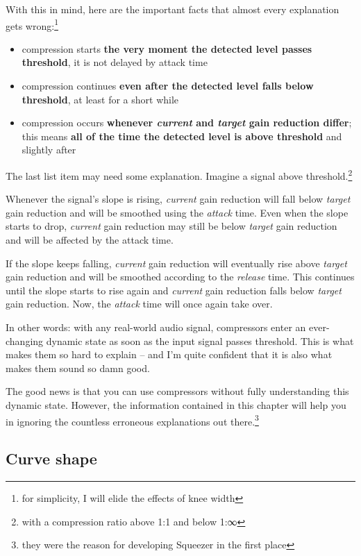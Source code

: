 With this in mind, here are the important facts that almost every
explanation gets wrong:\footnote{for simplicity, I will elide the
  effects of knee width}

\begin{itemize}
\item compression starts \textbf{the very moment the detected level
    passes threshold}, it is not delayed by attack time
\item compression continues \textbf{even after the detected level
    falls below threshold}, at least for a short while
\item compression occurs \textbf{whenever \emph{current} and
    \emph{target} gain reduction differ}; this means \textbf{all of
    the time the detected level is above threshold} and slightly after
\end{itemize}

The last list item may need some explanation.  Imagine a signal above
threshold.\footnote{with a compression ratio above 1:1 and below 1:∞}

Whenever the signal's slope is rising, \emph{current} gain reduction
will fall below \emph{target} gain reduction and will be smoothed
using the \emph{attack} time.  Even when the slope starts to drop,
\emph{current} gain reduction may still be below \emph{target} gain
reduction and will be affected by the attack time.

If the slope keeps falling, \emph{current} gain reduction will
eventually rise above \emph{target} gain reduction and will be
smoothed according to the \emph{release} time.  This continues until
the slope starts to rise again and \emph{current} gain reduction falls
below \emph{target} gain reduction.  Now, the \emph{attack} time will
once again take over.

In other words: with any real-world audio signal, compressors enter an
ever-changing dynamic state as soon as the input signal passes
threshold.  This is what makes them so hard to explain -- and I'm
quite confident that it is also what makes them sound so damn good.

The good news is that you can use compressors without fully
understanding this dynamic state.  However, the information contained
in this chapter will help you in ignoring the countless erroneous
explanations out there.\footnote{they were the reason for developing
  Squeezer in the first place}

\subsection{Curve shape}
\label{sec:curve_shape}

